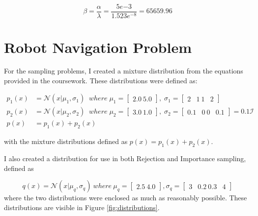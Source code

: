 \documentclass[a4paper, 11pt]{article}
\begin{document}
$$\beta = \frac{\alpha}{\lambda} = \frac{5e{-3}}{1.523e^{-8}} = 65659.96$$

\pagebreak

\section{Robot Navigation Problem}

For the sampling problems, I created a mixture distribution from the equations provided in the coursework. These distributions were defined as:



\begin{equation}\label{eq:gauss1}
    \begin{align}
        p_1(x) &= \mathcal{N}(x|\mu_1, \sigma_1) \; \; where \; \mu_1 = \begin{bmatrix}2.0 \ 5.0\end{bmatrix},  \; \sigma_1 = \begin{bmatrix}2 & 1 \ 1 & 2\end{bmatrix} \\
        p_2(x) &= \mathcal{N}(x|\mu_2, \sigma_2) \; \; where \; \mu_2 = \begin{bmatrix}3.0 \ 1.0\end{bmatrix},  \; \sigma_2 = \begin{bmatrix}0.1 & 0 \ 0 & 0.1\end{bmatrix} = 0.1 \mathcal{I} \\
        p(x) &= p_1(x) + p_2(x)
    \end{align}
\end{equation}

with the mixture distributions defined as $ p(x) = p_1(x) + p_2(x)$. 

I also created a distribution for use in both Rejection and Importance sampling, defined as 


\begin{equation}\label{eq:dist}
        q(x) = \mathcal{N}(x|\mu_q, \sigma_q) \: where \: \mu_q = \begin{bmatrix}2.5 \ 4.0\end{bmatrix}, \sigma_q = \begin{bmatrix}3 & 0.2 \ 0.3 & 4\end{bmatrix}
\end{equation}
where the two distributions were enclosed as much as reasonably possible. These distributions are visible in Figure \ref*{fig:distributions}.
\end{document}

